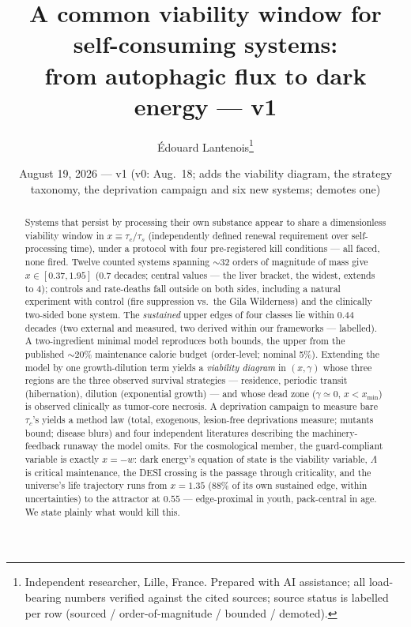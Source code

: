 \documentclass[11pt]{article}
\title{\textbf{A common viability window for self-consuming systems:\\ from autophagic flux to dark energy --- v1}}
\author{\'Edouard Lantenois\thanks{Independent researcher, Lille, France. Prepared with AI assistance; all load-bearing numbers verified against the cited sources; source status is labelled per row (sourced / order-of-magnitude / bounded / demoted).}}
\date{August 19, 2026 --- v1 (v0: Aug.\ 18; adds the viability diagram, the strategy taxonomy, the deprivation campaign and six new systems; demotes one)}
\begin{document}
\maketitle
\begin{abstract}
Systems that persist by processing their own substance appear to share a dimensionless viability
window in $x \equiv \tau_c/\tau_s$ (independently defined renewal requirement over self-processing
time), under a protocol with four pre-registered kill conditions --- all faced, none fired.
Twelve counted systems spanning $\sim$32 orders of magnitude of mass give $x \in [0.37, 1.95]$
(0.7 decades; central values --- the liver bracket, the widest, extends to 4); controls and rate-deaths fall outside on both sides, including a natural experiment
with control (fire suppression vs.\ the Gila Wilderness) and the clinically two-sided bone system.
The \emph{sustained} upper edges of four classes lie within 0.44 decades (two external and
measured, two derived within our frameworks --- labelled). A two-ingredient minimal model
reproduces both bounds, the upper from the published $\sim$20\% maintenance calorie budget
(order-level; nominal 5\%). Extending the model by one growth-dilution term yields a
\emph{viability diagram} in $(x, \gamma)$ whose three regions are the three observed survival
strategies --- residence, periodic transit (hibernation), dilution (exponential growth) --- and
whose dead zone ($\gamma \simeq 0$, $x < x_{\min}$) is observed clinically as tumor-core necrosis.
A deprivation campaign to measure bare $\tau_c$'s yields a method law (total, exogenous,
lesion-free deprivations measure; mutants bound; disease blurs) and four independent literatures
describing the machinery-feedback runaway the model omits. For the cosmological member, the
guard-compliant variable is exactly $x = -w$: dark energy's equation of state is the viability
variable, $\Lambda$ is critical maintenance, the DESI crossing is the passage through criticality,
and the universe's life trajectory runs from $x = 1.35$ (88\% of its own sustained edge, within
uncertainties) to the attractor at $0.55$ --- edge-proximal in youth, pack-central in age.
We state plainly what would kill this.
\end{abstract}
\end{document}
